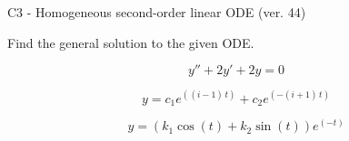 \begin{exercise}
  \begin{exerciseTitle}C3 - Homogeneous second-order linear ODE (ver. 44)\end{exerciseTitle}
  \begin{exerciseStatement}
    
Find the general solution to the given ODE.

    
\[y''+2y'+2y = 0\]

  \end{exerciseStatement}
  \begin{exerciseAnswer}
    
\[y= c_{1} e^{\left(\left(i - 1\right) \, t\right)} + c_{2} e^{\left(-\left(i + 1\right) \, t\right)}\]

    
\[y= {\left(k_{1} \cos\left(t\right) + k_{2} \sin\left(t\right)\right)} e^{\left(-t\right)}\]

  \end{exerciseAnswer}
\end{exercise}